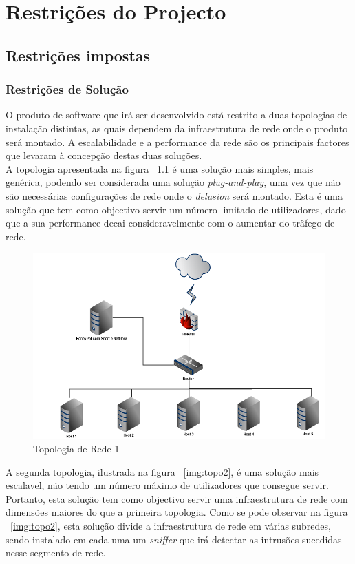 \chapter{Restrições do Projecto}
\minitoc
\section{Restrições impostas}
\subsection{Restrições de Solução}
O produto de software que irá ser desenvolvido está restrito a duas topologias de instalação distintas, as quais dependem da infraestrutura de rede onde o produto será montado. A escalabilidade e a performance da rede são os principais factores que levaram à concepção destas duas soluções.\\

A topologia apresentada na figura ~\ref{img:topo1} é uma solução mais simples, mais genérica, podendo ser considerada uma solução \textit{plug-and-play}, uma vez que não são necessárias configurações de rede onde o \textit{delusion} será montado. Esta é uma solução que tem como objectivo servir um número limitado de utilizadores, dado que a sua performance decai consideravelmente com o aumentar do trâfego de rede. \\

\begin{figure}
	\centering	
	\includegraphics[scale=0.6]{images/topologia1.png}
	\caption{Topologia de Rede 1}
    \label{img:topo1}
\end{figure}

A segunda topologia, ilustrada na figura ~\ref{img:topo2}, é uma solução mais escalavel, não tendo um número máximo de utilizadores que consegue servir. Portanto, esta solução tem como objectivo servir uma infraestrutura de rede com dimensões maiores do que a primeira topologia. Como se pode observar na figura ~\ref{img:topo2}, esta solução divide a infraestrutura de rede em várias subredes, sendo instalado em cada uma um \textit{sniffer} que irá detectar as intrusões sucedidas nesse segmento de rede.

